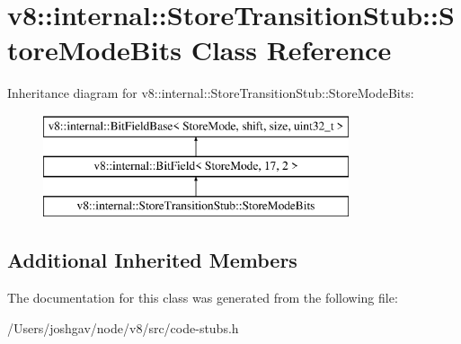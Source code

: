 \hypertarget{classv8_1_1internal_1_1_store_transition_stub_1_1_store_mode_bits}{}\section{v8\+:\+:internal\+:\+:Store\+Transition\+Stub\+:\+:Store\+Mode\+Bits Class Reference}
\label{classv8_1_1internal_1_1_store_transition_stub_1_1_store_mode_bits}
Inheritance diagram for v8\+:\+:internal\+:\+:Store\+Transition\+Stub\+:\+:Store\+Mode\+Bits\+:\begin{figure}[H]
\begin{center}
\leavevmode
\includegraphics[height=3.000000cm]{classv8_1_1internal_1_1_store_transition_stub_1_1_store_mode_bits}
\end{center}
\end{figure}
\subsection*{Additional Inherited Members}


The documentation for this class was generated from the following file\+:\begin{DoxyCompactItemize}
\item 
/\+Users/joshgav/node/v8/src/code-\/stubs.\+h\end{DoxyCompactItemize}
